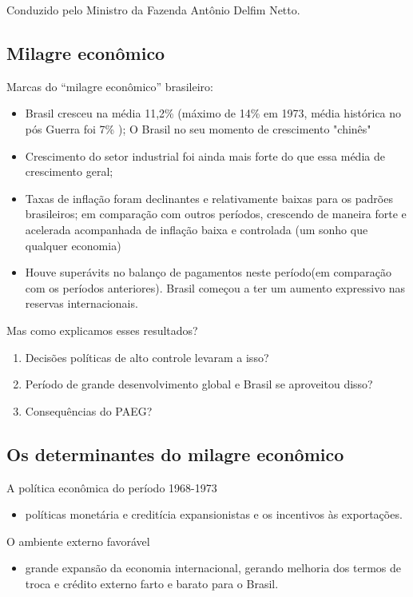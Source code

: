 \documentclass[a4paper,12pt]{article}[abntex2]
\begin{document}
Conduzido pelo Ministro da Fazenda Antônio Delfim Netto.

\subsection{\textbf{Milagre econômico}}
Marcas do “milagre econômico” brasileiro:\begin{itemize}
    \item Brasil cresceu na média 11,2\% (máximo de 14\% em 1973, média histórica no pós Guerra foi 7\% ); O Brasil no seu momento de crescimento "chinês"
    \item Crescimento do setor industrial foi ainda mais forte do que essa média de crescimento geral; 
    \item Taxas de inflação foram declinantes e relativamente baixas para os padrões brasileiros; em comparação com outros períodos, crescendo de maneira forte e acelerada acompanhada de inflação baixa e controlada (um sonho que qualquer economia)
    \item Houve superávits no balanço de pagamentos neste período(em comparação com os períodos anteriores). Brasil começou a ter um aumento expressivo nas reservas internacionais.
\end{itemize}

Mas como explicamos esses resultados?\begin{enumerate}
    \item Decisões políticas de alto controle levaram a isso?
    \item Período de grande desenvolvimento global e Brasil se aproveitou disso?
    \item Consequências do PAEG?
\end{enumerate}

\subsection{\textbf{Os determinantes do milagre econômico}}
A política econômica do período 1968-1973 \begin{itemize}
    \item políticas monetária e creditícia expansionistas e os incentivos às exportações.
\end{itemize}

O ambiente externo favorável \begin{itemize}
    \item grande expansão da economia internacional, gerando melhoria dos termos de troca e crédito externo farto e barato para o Brasil.
\end{itemize}
\end{document}
